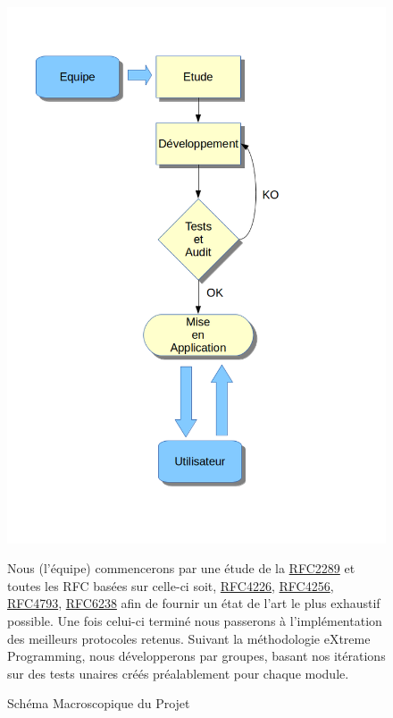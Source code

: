 \documentclass{"../../res/univ-projet"}
\begin{document}
\begin{figure}[h]
  \centering
  \includegraphics[scale=0.5]{../graphics/diagramme1.png}
  \caption{Schéma Macroscopique du Projet}
  \setlength{\parindent}{1cm}
  \begin{flushleft}
  Nous (l'équipe) commencerons par une étude de la \href{http://tools.ietf.org/html/rfc2289}{RFC2289} et toutes les RFC basées sur celle-ci
  soit, \href{http://tools.ietf.org/html/rfc4226}{RFC4226}, \href{http://tools.ietf.org/html/rfc4256}{RFC4256}, 
  \href{http://tools.ietf.org/html/rfc4793}{RFC4793}, \href{http://tools.ietf.org/html/rfc6238}{RFC6238} afin de fournir un état de l'art le plus exhaustif possible. Une fois celui-ci terminé nous passerons à
  l'implémentation des meilleurs protocoles retenus. Suivant la méthodologie eXtreme Programming, nous développerons par groupes, basant nos itérations sur des tests unaires créés préalablement pour chaque module.
  \end{flushleft}
\end{figure}
\end{document}
